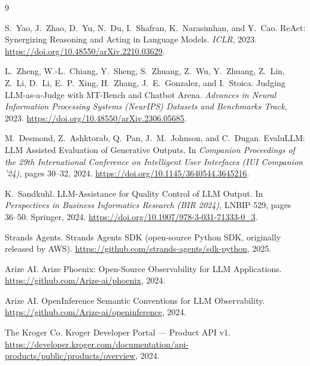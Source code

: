 \documentclass{article}
\begin{document}
\newpage

\begin{thebibliography}{9}

S.~Yao, J.~Zhao, D.~Yu, N.~Du, I.~Shafran, K.~Narasimhan, and Y.~Cao.
\newblock ReAct: Synergizing Reasoning and Acting in Language Models.
\newblock \emph{ICLR}, 2023.
\newblock \url{https://doi.org/10.48550/arXiv.2210.03629}.

L.~Zheng, W.-L.~Chiang, Y.~Sheng, S.~Zhuang, Z.~Wu, Y.~Zhuang, Z.~Lin, Z.~Li, D.~Li, E.~P.~Xing, H.~Zhang, J.~E.~Gonzalez, and I.~Stoica.
\newblock Judging LLM-as-a-Judge with MT-Bench and Chatbot Arena.
\newblock \emph{Advances in Neural Information Processing Systems (NeurIPS) Datasets and Benchmarks Track}, 2023.
\newblock \url{https://doi.org/10.48550/arXiv.2306.05685}.

M.~Desmond, Z.~Ashktorab, Q.~Pan, J.~M.~Johnson, and C.~Dugan.
\newblock EvaluLLM: LLM Assisted Evaluation of Generative Outputs.
\newblock In \emph{Companion Proceedings of the 29th International Conference on Intelligent User Interfaces (IUI Companion '24)}, pages 30--32, 2024.
\newblock \url{https://doi.org/10.1145/3640544.3645216}.

K.~Sandkuhl.
\newblock LLM-Assistance for Quality Control of LLM Output.
\newblock In \emph{Perspectives in Business Informatics Research (BIR 2024)}, LNBIP 529, pages 36--50. Springer, 2024.
\newblock \url{https://doi.org/10.1007/978-3-031-71333-0_3}.

Strands Agents.
\newblock Strands Agents SDK (open-source Python SDK, originally released by AWS).
\newblock \url{https://github.com/strands-agents/sdk-python}, 2025.

Arize AI.
\newblock Arize Phoenix: Open-Source Observability for LLM Applications.
\newblock \url{https://github.com/Arize-ai/phoenix}, 2024.

Arize AI.
\newblock OpenInference Semantic Conventions for LLM Observability.
\newblock \url{https://github.com/Arize-ai/openinference}, 2024.

The Kroger Co.
\newblock Kroger Developer Portal --- Product API v1.
\newblock \url{https://developer.kroger.com/documentation/api-products/public/products/overview}, 2024.

\end{thebibliography}
\end{document}
